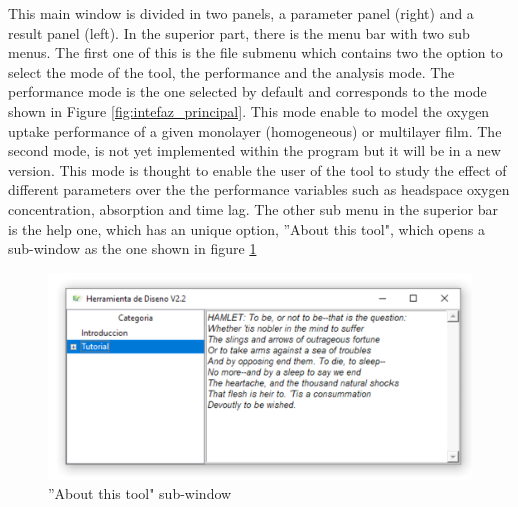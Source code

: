 \begin{refsection}
This main window is divided in two panels, a parameter panel (right) and a result panel (left). In the superior part, there is the menu bar with two sub menus. The first one of this is the file submenu which contains two the option to select the mode of the tool, the performance and the analysis mode. The performance mode is the one selected by default and corresponds to the mode shown in Figure \ref{fig:intefaz_principal}. This mode enable to model the oxygen uptake performance of a given monolayer (homogeneous) or multilayer film. The second mode, is not yet implemented within the program but it will be in a new version. This mode is thought to enable the user of the tool to study the effect of different parameters over the the performance variables such as headspace oxygen concentration, absorption and time lag. The other sub menu in the superior bar is the help one, which has an unique option, ''About this tool", which opens a sub-window as the one shown in figure \ref{fig:help_window}
 \begin{figure}[H]
     \centering
     \includegraphics[width=0.8\linewidth]{Documento_Latex/Tesis_1/Imagenes/menu_ayuda.png}
     \caption{''About this tool" sub-window}
     \label{fig:help_window}
 \end{figure}

\end{refsection}
